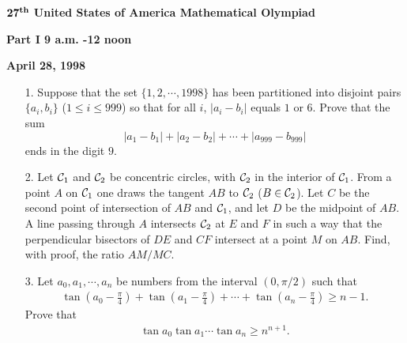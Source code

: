 \documentclass[12pt]{article}
\begin{document}
%

\begin{center}
${\bf 27^{th}}$ {\bf United States of America Mathematical Olympiad}
\end{center}



\begin{center}
{\bf  Part  I \hspace{ 6mm} 9 a.m. -12 noon}
\end{center}


\begin{center}
{\bf April 28, 1998}
\end{center}

\bigskip 


\begin{itemize}

\item[1.] Suppose that the set $\{1,2,\cdots, 1998\}$ has been partitioned
into disjoint pairs $\{a_i,b_i\}$ ($1\leq i\leq 999$) so that
for all $i$, $|a_i-b_i|$ equals $1$ or $6$. Prove that the sum
$$|a_1-b_1|+|a_2-b_2|+\cdots +|a_{999}-b_{999}|$$ 
ends in 
the digit $9$.  


\item[2.] Let ${\cal C}_1$ and ${\cal C}_2$ be  concentric circles, with
${\cal C}_2$ in the interior of  ${\cal C}_1$. From a point $A$
on ${\cal C}_1$ one draws the tangent $AB$ to ${\cal C}_2$ ($B\in {\cal C}_2$).
Let $C$ be the second point of intersection 
of $AB$ and ${\cal C}_1$, and 
let   $D$ be the midpoint of 
$AB$. A line passing through $A$ intersects ${\cal C}_2$
at $E$ and $F$ in such a way that the perpendicular  bisectors of 
$DE$ and $CF$ intersect at a point $M$ on $AB$.
Find, with proof,  the ratio $AM/MC$.


 
\item[3.] Let $a_0,a_1,\cdots ,a_n$ be numbers from the interval
$(0,\pi/2)$ such that 
\begin{eqnarray*}
\tan (a_0-\frac{\pi}{4})+ \tan (a_1-\frac{\pi}{4})+\cdots
+\tan (a_n-\frac{\pi}{4})\geq n-1.
\end{eqnarray*}
Prove that
\begin{eqnarray*}
\tan a_0\tan a_1 \cdots \tan a_n\geq n^{n+1}.
\end{eqnarray*}

\end{itemize}

\vspace{110 mm}
\end{document}
